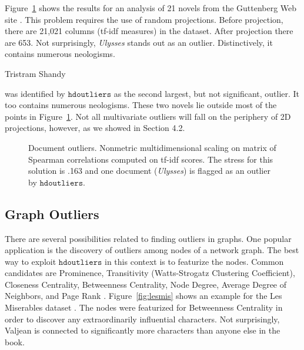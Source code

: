\documentclass[12pt]{article}
\begin{document}
Figure~\ref{fig:novels} shows the results for an analysis of 21 novels from the Guttenberg Web site \citep{Gutenberg}. This problem requires the use of random projections. Before projection, there are 21,021 columns (tf-idf measures) in the dataset. After projection there are 653. Not surprisingly, {\it Ulysses} stands out as an outlier. Distinctively, it contains numerous neologisms. {\it 

Tristram Shandy} was identified by $\mathtt{hdoutliers}$ as the second largest, but not significant, outlier. It too contains numerous neologisms. These two novels lie outside most of the points in Figure~\ref{fig:novels}. Not all multivariate outliers will fall on the periphery of 2D projections, however, as we showed in Section 4.2.

\begin{figure}[h]
\caption{\label{fig:novels}  Document outliers. Nonmetric multidimensional scaling on matrix of Spearman correlations computed on tf-idf scores. The stress for this solution is .163 and one document ({\it Ulysses}) is flagged as an outlier by $\mathtt{hdoutliers}$.}
\end{figure}

\subsection{Graph Outliers}
There are several possibilities related to finding outliers in graphs. One popular application is the discovery of outliers among nodes of a network graph. The best way to exploit $\mathtt{hdoutliers}$ in this context is to featurize the nodes. Common candidates are Prominence, Transitivity (Watts-Strogatz Clustering Coefficient), Closeness Centrality, Betweenness Centrality, Node Degree, Average Degree of Neighbors, and Page Rank \citep{Newman0}. Figure~\ref{fig:lesmis} shows an example for the Les Miserables dataset \citep{StanfordGraphBase}. The nodes were featurized for Betweenness Centrality in order to discover any extraordinarily influential characters. Not surprisingly, Valjean is connected to significantly more characters than anyone else in the book.
\end{document}
